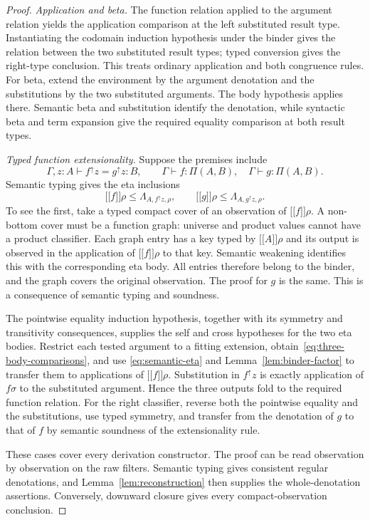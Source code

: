 \documentclass[11pt,a4paper]{article}
\theoremstyle{definition}
\theoremstyle{remark}
\newcommand{\ev}[1]{\mathopen{[\![}#1\mathclose{]\!]}}
\begin{document}
\begin{proof}
\smallskip\noindent\emph{Application and beta.}
The function relation applied to the argument relation yields the
application comparison at the left substituted result type.
Instantiating the codomain induction hypothesis under the binder gives
the relation between the two substituted result types; typed conversion
gives the right-type conclusion. This treats ordinary application and
both congruence rules. For beta, extend the environment by the argument
denotation and the substitutions by the two substituted arguments.
The body hypothesis applies there. Semantic beta and substitution
identify the denotation, while syntactic beta and term expansion give
the required equality comparison at both result types.

\smallskip\noindent\emph{Typed function extensionality.}
Suppose the premises include
\[
 \Gamma,z:A\vdash f^{\uparrow}z=g^{\uparrow}z:B,
 \qquad \Gamma\vdash f:\Pi(A,B),\quad
 \Gamma\vdash g:\Pi(A,B).
\]
Semantic typing gives the eta inclusions
\begin{equation}\label{eq:semantic-eta}
 \ev f\rho\leq\Lambda_{A,f^{\uparrow}z,\rho},\qquad
 \ev g\rho\leq\Lambda_{A,g^{\uparrow}z,\rho}.
\end{equation}
To see the first, take a typed compact cover of an observation of
$\ev f\rho$. A non-bottom cover must be a function graph: universe and
product values cannot have a product classifier. Each graph entry has a
key typed by $\ev A\rho$ and its output is observed in the application
of $\ev f\rho$ to that key. Semantic weakening identifies this with the
corresponding eta body. All entries therefore belong to the binder,
and the graph covers the original observation. The proof for $g$ is
the same. This is a consequence of semantic typing and soundness.

The pointwise equality induction hypothesis, together with its symmetry
and transitivity consequences, supplies the self and cross hypotheses
for the two eta bodies. Restrict each tested argument to a fitting
extension, obtain~\eqref{eq:three-body-comparisons}, and use
\eqref{eq:semantic-eta} and Lemma~\ref{lem:binder-factor} to transfer them
to applications of $\ev f\rho$. Substitution in $f^{\uparrow}z$ is exactly
application of $f\sigma$ to the substituted argument. Hence the three
outputs fold to the required function relation. For the right classifier,
reverse both the pointwise equality and the substitutions, use typed
symmetry, and transfer from the denotation of $g$ to that of $f$ by
semantic soundness of the extensionality rule.

These cases cover every derivation constructor. The proof can be read
observation by observation on the raw filters. Semantic typing gives
consistent regular denotations, and Lemma~\ref{lem:reconstruction}
then supplies the whole-denotation assertions. Conversely, downward
closure gives every compact-observation conclusion.
\end{proof}
\end{document}

